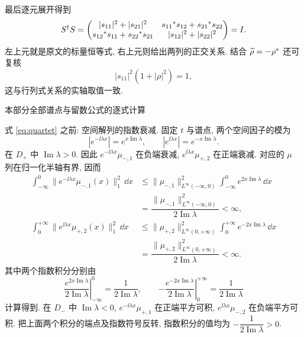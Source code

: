 最后逐元展开得到
\begin{equation*}
S^\dagger S
=\begin{pmatrix}
|s_{11}|^2+|s_{21}|^2&{s_{11}}^{*}s_{12}+{s_{21}}^{*}s_{22}\\
{s_{12}}^{*}s_{11}+{s_{22}}^{*}s_{21}&|s_{12}|^2+|s_{22}|^2
\end{pmatrix}=I.
\end{equation*}
左上元就是原文的标量恒等式, 右上元则给出两列的正交关系.
结合 $\widetilde\rho=-{\rho}^{*}$ 还可复核
\begin{equation*}
|s_{11}|^2(1+|\rho|^2)=1,
\end{equation*}
这与行列式关系的实轴取值一致.



\par\medskip\noindent 本部分全部谱点与留数公式的逐式计算\par
\par\smallskip\noindent 式 \eqref{eq:quartet} 之前: 空间解列的指数衰减.\quad
固定 $t$ 与谱点, 两个空间因子的模为
\begin{equation*}
|e^{-\ii\lambda x}|=e^{x\operatorname{Im}\lambda},
\qquad
|e^{\ii\lambda x}|=e^{-x\operatorname{Im}\lambda}.
\end{equation*}
在 $D_+$ 中 $\operatorname{Im}\lambda>0$.
因此 $e^{-\ii\lambda x}\mu_{-,1}$ 在负端衰减,
$e^{\ii\lambda x}\mu_{+,2}$ 在正端衰减.
对应的 $\mu$ 列在归一化半轴有界, 因而
\begin{align*}
\int_{-\infty}^0\|e^{-\ii\lambda x}\mu_{-,1}(x)\|_1^2\,\dd x
&\le\|\mu_{-,1}\|_{L^\infty(-\infty,0)}^2
\int_{-\infty}^0e^{2x\operatorname{Im}\lambda}\,\dd x\\
&=\dfrac{\|\mu_{-,1}\|_{L^\infty(-\infty,0)}^2}
{2\operatorname{Im}\lambda}<\infty,\\
\int_0^{+\infty}\|e^{\ii\lambda x}\mu_{+,2}(x)\|_1^2\,\dd x
&\le\|\mu_{+,2}\|_{L^\infty(0,+\infty)}^2
\int_0^{+\infty}e^{-2x\operatorname{Im}\lambda}\,\dd x\\
&=\dfrac{\|\mu_{+,2}\|_{L^\infty(0,+\infty)}^2}
{2\operatorname{Im}\lambda}<\infty.
\end{align*}
其中两个指数积分分别由
\begin{equation*}
\left.\dfrac{e^{2x\operatorname{Im}\lambda}}{2\operatorname{Im}\lambda}
\right|_{-\infty}^0
=\dfrac{1}{2\operatorname{Im}\lambda},
\qquad
\left.-\dfrac{e^{-2x\operatorname{Im}\lambda}}{2\operatorname{Im}\lambda}
\right|_0^{+\infty}
=\dfrac{1}{2\operatorname{Im}\lambda}
\end{equation*}
计算得到.
在 $D_-$ 中 $\operatorname{Im}\lambda<0$,
$e^{-\ii\lambda x}\mu_{+,1}$ 在正端平方可积,
$e^{\ii\lambda x}\mu_{-,2}$ 在负端平方可积.
把上面两个积分的端点及指数符号反转, 指数积分的值均为
$-\dfrac{1}{2\operatorname{Im}\lambda}>0$.


